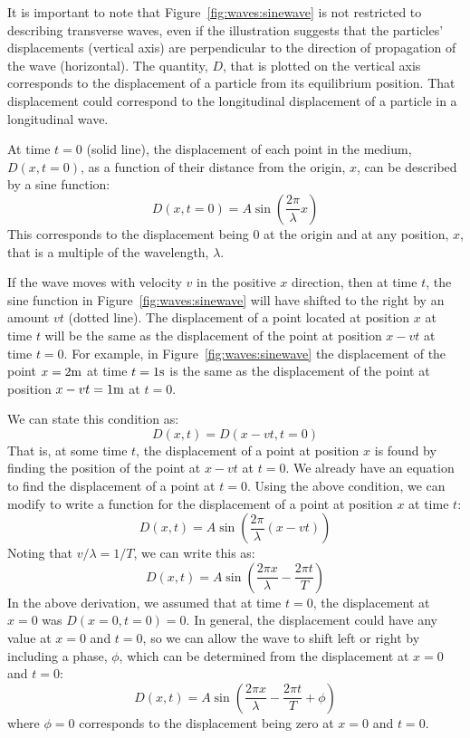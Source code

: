 It is important to note that Figure~\ref{fig:waves:sinewave} is not restricted to describing transverse waves, even if the illustration suggests that the particles' displacements (vertical axis) are perpendicular to the direction of propagation of the wave (horizontal). The quantity, $D$, that is plotted on the vertical axis corresponds to the displacement of a particle from its equilibrium position. That displacement could correspond to the longitudinal displacement of a particle in a longitudinal wave.

At time $t=0$ (solid line), the displacement of each point in the medium, $D(x, t=0)$, as a function of their distance from the origin, $x$, can be described by a sine function:
\begin{equation}
D(x,t=0) = A\sin\left( \frac{2\pi}{\lambda}x \right)
\end{equation}
This corresponds to the displacement being 0 at the origin and at any position, $x$, that is a multiple of the wavelength, $\lambda$.

If the wave moves with velocity $v$ in the positive $x$ direction, then at time $t$, the sine function in Figure~\ref{fig:waves:sinewave} will have shifted to the right by an amount $vt$ (dotted line). The displacement of a point located at position $x$ at time $t$ will be the same as the displacement of the point at position $x -vt$ at time $t=0$. For example, in Figure~\ref{fig:waves:sinewave} the displacement of the point $x=2 {\rm m}$ at time $t=1 {\rm s}$ is the same as the displacement of the point at position $x -vt=1 {\rm m}$ at $t=0$.

We can state this condition as:
\begin{equation}
D(x,t) = D(x-vt, t=0)
\end{equation}
That is, at some time $t$, the displacement of a point at position $x$ is found by finding the position of the point at $x -vt$ at $t=0$. We already have an equation to find the displacement of a point at $t=0$.  Using the above condition, we can modify \href{\#eq:waves:wavex}{} to write a function for the displacement of a point at position $x$ at time $t$:
\begin{equation}
D(x,t) = A\sin\left( \frac{2\pi}{\lambda}(x-vt) \right)
\end{equation}
Noting that $v/\lambda= 1/T$, we can write this as:
\begin{equation}
D(x,t) = A\sin\left( \frac{2\pi x}{\lambda}- \frac{2\pi t}{T} \right)
\end{equation}
In the above derivation, we assumed that at time $t=0$, the displacement at $x=0$ was $D(x=0, t=0)=0$. In general, the displacement could have any value at $x=0$ and $t=0$, so we can allow the wave to shift left or right by including a phase, $\phi$, which can be determined from the displacement at $x=0$ and $t=0$:
\begin{equation}
\boxed{D(x,t) = A\sin\left( \frac{2\pi x}{\lambda}- \frac{2\pi t}{T} + \phi \right)}
\end{equation}
where $\phi=0$ corresponds to the displacement being zero at $x=0$ and $t=0$.

